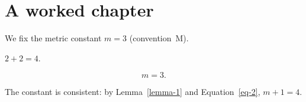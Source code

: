 \section{A worked chapter}

We fix the metric constant $m = 3$ (convention~M).

\begin{lemma}\label{lemma-1}
  $2 + 2 = 4$.
\end{lemma}

\begin{equation}\label{eq-2}
  m = 3.
\end{equation}

\begin{theorem}\label{thm-3}
  The constant is consistent: by Lemma~\ref{lemma-1} and Equation~\eqref{eq-2}, $m + 1 = 4$.
\end{theorem}
